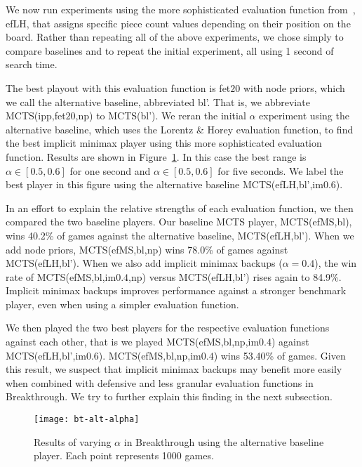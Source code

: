 \documentclass{article}
\begin{document}

\vspace{0.2cm}

We now run experiments using the more sophisticated evaluation function from~\cite{Lorentz13Breakthrough}, 
efLH, that assigns specific piece count values depending on their position on the board. 
Rather than repeating all of the above experiments, we chose simply to compare baselines and to repeat
the initial experiment, all using 1 second of search time.

The best playout with this evaluation function is fet$20$ with node priors, which we call the alternative baseline, 
abbreviated bl'.
That is, we abbreviate MCTS(ipp,fet$20$,np) to MCTS(bl').
We reran the initial $\alpha$ experiment using the alternative baseline, 
which uses the Lorentz \& Horey evaluation function, to find the best implicit minimax player using this 
more sophisticated evaluation function. Results are shown in Figure~\ref{fig:bt-alt-alpha}. 
In this case the best range is $\alpha \in [0.5,0.6]$ for one second and $\alpha \in [0.5,0.6]$ for
five seconds.
We label the best player in this figure using the alternative baseline MCTS(efLH,bl',im$0.6$). 

In an effort to explain the relative strengths of each evaluation function, we then compared the two baseline players. 
Our baseline MCTS player, MCTS(efMS,bl), wins 40.2\% of games against the alternative baseline, MCTS(efLH,bl'). 
When we add node priors, MCTS(efMS,bl,np) wins 78.0\% of games against MCTS(efLH,bl'). 
When we also add implicit minimax backups ($\alpha = 0.4$), the win rate of MCTS(efMS,bl,im$0.4$,np) versus MCTS(efLH,bl') rises again to 84.9\%. 
Implicit minimax backups improves performance against a stronger benchmark player, even when using a simpler evaluation function. 

We then played the two best players for the respective evaluation functions against each other, 
that is we played MCTS(efMS,bl,np,im$0.4$) against MCTS(efLH,bl',im$0.6$). 
MCTS(efMS,bl,np,im$0.4$) wins 53.40\% of games. 
Given this result, we suspect that implicit minimax backups may benefit more easily when 
combined with defensive and less granular evaluation functions in Breakthrough. We try to 
further explain this finding in the next subsection. \\

\begin{figure}[t]
\begin{center}
\texttt{[image: bt-alt-alpha]}
\caption{Results of varying $\alpha$ in Breakthrough using the alternative baseline player.
Each point represents 1000 games.} 
\label{fig:bt-alt-alpha}
\end{center}
\end{figure}
\end{document}
